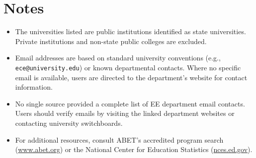 \documentclass[12pt]{article}
\begin{document}
\section*{Notes}
\begin{itemize}
    \item The universities listed are public institutions identified as state universities. Private institutions and non-state public colleges are excluded.
    \item Email addresses are based on standard university conventions (e.g., \texttt{ece@university.edu}) or known departmental contacts. Where no specific email is available, users are directed to the department’s website for contact information.
    \item No single source provided a complete list of EE department email contacts. Users should verify emails by visiting the linked department websites or contacting university switchboards.
    \item For additional resources, consult ABET’s accredited program search (\url{www.abet.org}) or the National Center for Education Statistics (\url{nces.ed.gov}).
\end{itemize}
\end{document}
